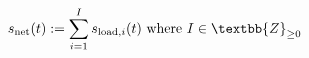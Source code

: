 \begin{equation}
	s_\text{net}(t) := \sum_{i=1}^{I} s_{\text{load},i}(t)
	\text{ where } I \in \textbb{Z}_{\geq 0}
\end{equation}